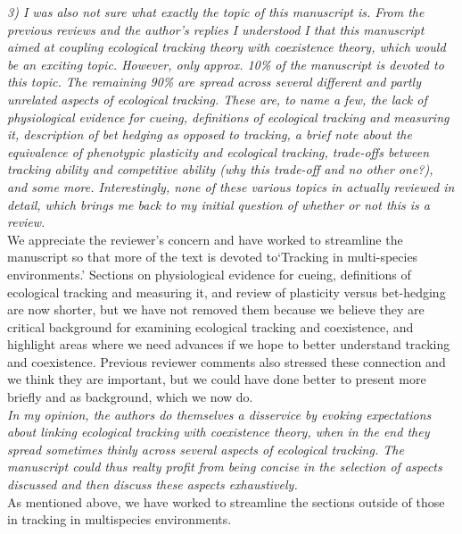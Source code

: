 \documentclass[11pt]{article}
\begin{document}
\emph{3) I was also not sure what exactly the topic of this manuscript is. From the previous
reviews and the author’s replies I understood I that this manuscript aimed at coupling
ecological tracking theory with coexistence theory, which would be an exciting topic.
However, only approx. 10\% of the manuscript is devoted to this topic. The remaining 90\% are
spread across several different and partly unrelated aspects of ecological tracking. These
are, to name a few, the lack of physiological evidence for cueing, definitions of ecological
tracking and measuring it, description of bet hedging as opposed to tracking, a brief note
about the equivalence of phenotypic plasticity and ecological tracking, trade-offs between
tracking ability and competitive ability (why this trade-off and no other one?), and some
more. Interestingly, none of these various topics in actually reviewed in detail, which
brings me back to my initial question of whether or not this is a review.}\\

We appreciate the reviewer's concern and have worked to streamline the manuscript so that more of the text is devoted to`Tracking in multi-species environments.' Sections on physiological evidence for cueing, definitions of ecological
tracking and measuring it, and review of plasticity versus bet-hedging are now shorter, but we have not removed them because we believe they are critical background for examining ecological tracking and coexistence, and highlight areas where we need advances if we hope to better understand tracking and coexistence. Previous reviewer comments also stressed these connection and we think they are important, but we could have done better to present more briefly and as background, which we now do. \\

\emph{In my opinion, the authors do themselves a disservice by evoking expectations about linking
ecological tracking with coexistence theory, when in the end they spread sometimes thinly
across several aspects of ecological tracking. The manuscript could thus realty profit from
being concise in the selection of aspects discussed and then discuss these aspects
exhaustively.}\\

As mentioned above, we have worked to streamline the sections outside of those in tracking in multispecies environments.\\
\end{document}
